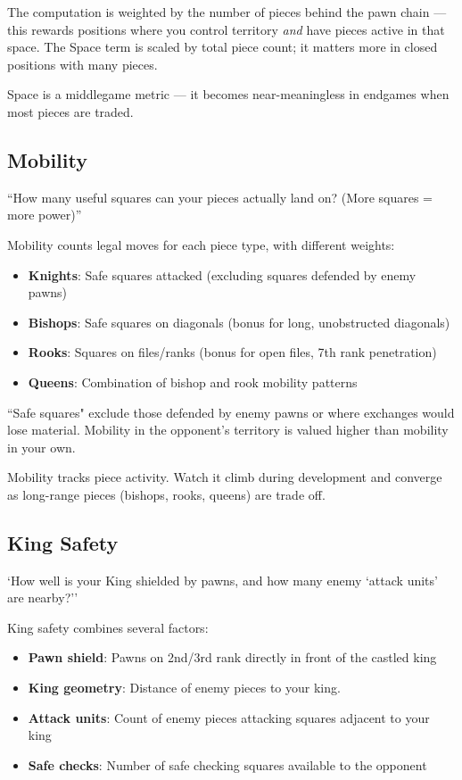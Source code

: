 \documentclass[12pt]{book}
\begin{document}
The computation is weighted by the number of pieces behind the pawn
chain --- this rewards positions where you control territory {\it and}
have pieces active in that space.
The Space term is scaled by total piece count; it matters more in
closed positions with many pieces.

Space is a middlegame metric --- it becomes near-meaningless in endgames when
most pieces are traded.

\subsection{Mobility}

``How many useful squares can your pieces actually land on? (More squares = more power)''


Mobility counts legal moves for each piece type, with different weights:
\begin{itemize}
\item \textbf{Knights}: Safe squares attacked (excluding squares defended by enemy pawns)
\item \textbf{Bishops}: Safe squares on diagonals (bonus for long, unobstructed diagonals)
\item \textbf{Rooks}: Squares on files/ranks (bonus for open files, 7th rank penetration)
\item \textbf{Queens}: Combination of bishop and rook mobility patterns
\end{itemize}

``Safe squares" exclude those defended by enemy pawns or where exchanges would lose material.
Mobility in the opponent's territory is valued higher than mobility in your own.

Mobility tracks piece activity. Watch it climb during development and converge as
long-range pieces (bishops, rooks, queens) are trade off.
  
\subsection{King Safety}

`How well is your King shielded by pawns, and how many enemy `attack units' are nearby?''

King safety combines several factors:
\begin{itemize}
\item \textbf{Pawn shield}: Pawns on 2nd/3rd rank directly in front of the castled king
\item \textbf{King geometry}: Distance of enemy pieces to your king.
  
\item \textbf{Attack units}: Count of enemy pieces attacking squares adjacent to your king
\item \textbf{Safe checks}: Number of safe checking squares available to the opponent
\end{itemize}
\end{document}
